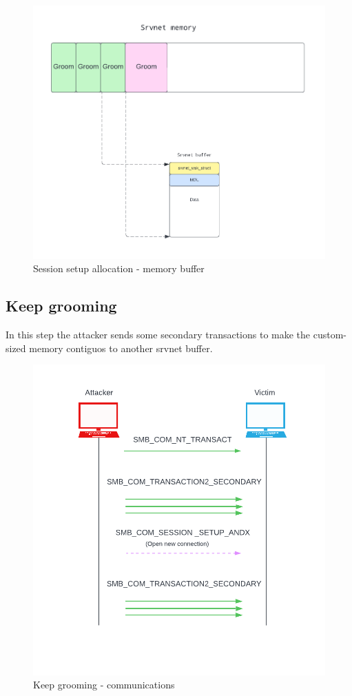 \begin{figure}[ht!]
    \centering
      \includegraphics[scale=0.5]{images/exploit_2_buff.png}
      \caption{Session setup allocation - memory buffer}
\end{figure}

\clearpage
\subsection{Keep grooming}
In this step the attacker sends some secondary transactions to make the custom-sized memory contiguos to another srvnet buffer.

\begin{figure}[ht!]
    \centering
      \includegraphics[scale=0.5]{images/exploit_3_comm.png}
      \caption{Keep grooming - communications}
\end{figure}

